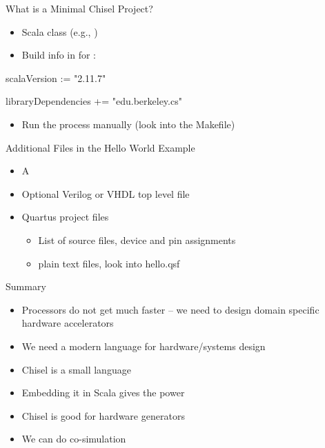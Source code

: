 \begin{frame}[fragile]{What is a Minimal Chisel Project?}
\begin{itemize}
\item Scala class (e.g., )
\item Build info in  for :
\end{itemize}
\begin{chisel}
scalaVersion := "2.11.7"

libraryDependencies += "edu.berkeley.cs" %
\end{chisel}
\begin{itemize}
\item Run the process manually (look into the Makefile)
\end{itemize}
\end{frame}

\begin{frame}[fragile]{Additional Files in the Hello World Example}
\begin{itemize}
\item A 
\item Optional Verilog or VHDL top level file %
\item Quartus project files 
\begin{itemize}
\item List of source files, device and pin assignments
\item plain text files, look into hello.qsf
\end{itemize}
\end{itemize}
\end{frame}

\begin{frame}[fragile]{Summary}
\begin{itemize}
\item Processors do not get much faster -- we need to design domain specific hardware accelerators
\item We need a modern language for hardware/systems design
\item Chisel is a small language
\item Embedding it in Scala gives the power
\item Chisel is good for hardware generators
\item We can do co-simulation
\end{itemize}
\end{frame}

